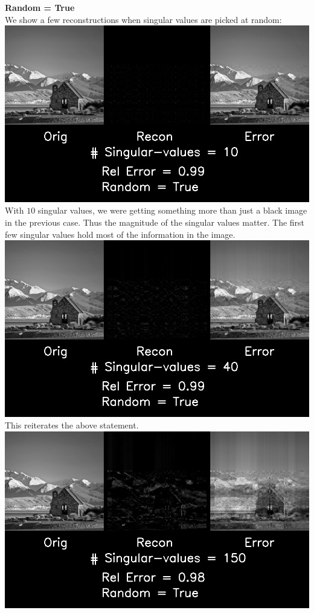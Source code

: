 \documentclass{article}
\begin{document}
\newpage
\textbf{Random = True}\\

We show a few reconstructions when singular values are picked at random:\\

\includegraphics[width =\textwidth]{SVD/a/Square/True/recon0010.png}\\
With $10$ singular values, we were getting something more than just a black image in the previous case. Thus the magnitude of the singular values matter. The first few singular values hold most of the information in the image.\\

\includegraphics[width =\textwidth]{SVD/a/Square/True/recon0040.png}\\

This reiterates the above statement.\\

\includegraphics[width =\textwidth]{SVD/a/Square/True/recon0150.png}\\
\end{document}
